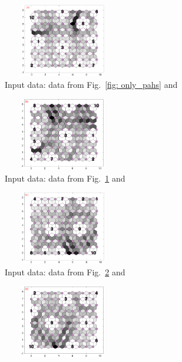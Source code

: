 
\begin{figure}
    \begin{subfigure}[b]{0.25\textwidth}
        \centering
        \includegraphics[width=52mm, height=32mm]{../../images0.01/M31/2D/diff_dimension/combine_2D_data_between_cols3and11.png}
        \captionsetup{font=tiny}
        \caption{Input data: data from Fig.~\ref{fig: only_pahs} and \halpha} 
        \label{fig: col3and11_dist}
    \end{subfigure}
    \hfill
    \begin{subfigure}[b]{0.25\textwidth}
        \centering
        \includegraphics[width=52mm, height=32mm]{../../images0.01/M31/2D/diff_dimension/combine_2D_data_between_cols3and12.png}
        \captionsetup{font=tiny}
        \caption{Input data: data from Fig.~\ref{fig: col3and11_dist} and \oiii} 
        \label{fig: col3and12_dist}
    \end{subfigure}
        \hfill
    \begin{subfigure}[b]{0.25\textwidth}
        \centering
        \includegraphics[width=52mm, height=32mm]{../../images0.01/M31/2D/diff_dimension/combine_2D_data_between_cols3and13.png}
        \captionsetup{font=tiny}
        \caption{Input data: data from Fig.~\ref{fig: col3and12_dist} and \sii} 
        \label{fig: col3and13_dist}
    \end{subfigure}
        \hfill
    \begin{subfigure}[b]{0.25\textwidth}
        \centering
        \includegraphics[width=52mm, height=32mm]{../../images0.01/M31/2D/diff_dimension/combine_2D_data_between_cols3and14.png}

\end{subfigure}
\end{figure}

